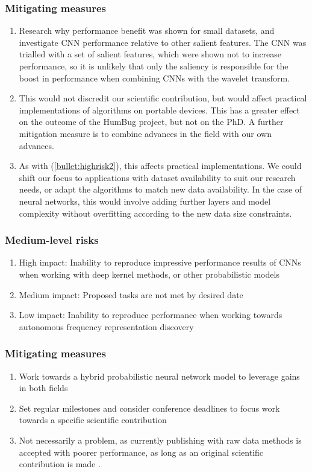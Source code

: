 \documentclass[12pt]{llncs}
\begin{document}
\subsubsection{Mitigating measures}
\begin{enumerate} 
    \item Research why performance benefit was shown for small datasets, and investigate CNN performance relative to other salient features. The CNN was trialled with a set of salient features, which were shown not to increase performance, so it is unlikely that only the saliency is responsible for the boost in performance when combining CNNs with the wavelet transform.
    \item This would not discredit our scientific contribution, but would affect practical implementations of algorithms on portable devices. This has a greater effect on the outcome of the HumBug project, but not on the PhD. A further mitigation measure is to combine advances in the field with our own advances.
	\item As with (\ref{bullet:highrisk2}), this affects practical implementations. We could shift our focus to applications with dataset availability to suit our research needs, or adapt the algorithms to match new data availability. In the case of neural networks, this would involve adding further layers and model complexity without overfitting according to the new data size constraints.

\end{enumerate}

\subsubsection{Medium-level risks} 
\begin{enumerate}
	\item High impact: Inability to reproduce impressive performance results of CNNs when working with deep kernel methods, or other probabilistic models
    \item Medium impact: Proposed tasks are not met by desired date
    \item Low impact: Inability to reproduce performance when working towards autonomous frequency representation discovery
\end{enumerate}
\subsubsection{Mitigating measures}
\begin{enumerate}
	\item Work towards a hybrid probabilistic neural network model to leverage gains in both fields
    \item Set regular milestones and consider conference deadlines to focus work towards a specific scientific contribution
    \item Not necessarily a problem, as currently publishing with raw data methods is accepted with poorer performance, as long as an original scientific contribution is made \cite{dieleman2014end}.
\end{enumerate}
\end{document}
